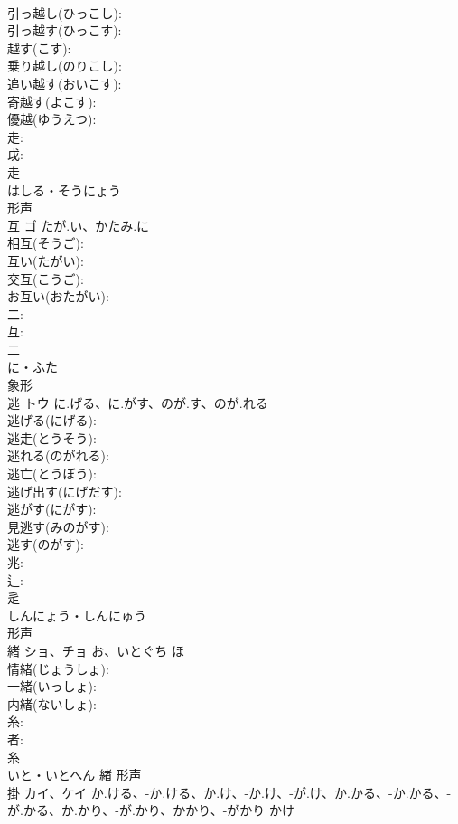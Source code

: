 \documentclass[8pt]{extreport}
\begin{document}
\begin{CJK}{UTF8}{min}
\\	引っ越し(ひっこし): 
\\	引っ越す(ひっこす): 
\\	越す(こす): 
\\	乗り越し(のりこし): 
\\	追い越す(おいこす): 
\\	寄越す(よこす): 
\\	優越(ゆうえつ): 
\\	走: 
\\	戉: 
\\	走	
\\	はしる・そうにょう	
\\	形声 
\\	互	ゴ	たが.い、かたみ.に		
\\	相互(そうご): 
\\	互い(たがい): 
\\	交互(こうご): 
\\	お互い(おたがい): 
\\	二: 
\\	彑: 
\\	二	
\\	に・ふた	
\\	象形 
\\	逃	トウ	に.げる、に.がす、のが.す、のが.れる		
\\	逃げる(にげる): 
\\	逃走(とうそう): 
\\	逃れる(のがれる): 
\\	逃亡(とうぼう): 
\\	逃げ出す(にげだす): 
\\	逃がす(にがす): 
\\	見逃す(みのがす): 
\\	逃す(のがす): 
\\	兆: 
\\	辶: 
\\	辵	
\\	しんにょう・しんにゅう	
\\	形声 
\\	緒	ショ、チョ	お、いとぐち	ほ	
\\	情緒(じょうしょ): 
\\	一緒(いっしょ): 
\\	内緒(ないしょ): 
\\	糸: 
\\	者: 
\\	糸	
\\	いと・いとへん	緖	形声 
\\	掛	カイ、ケイ	か.ける、-か.ける、か.け、-か.け、-が.け、か.かる、-か.かる、-が.かる、か.かり、-が.かり、かかり、-がかり	かけ	

\end{CJK}
\end{document}
